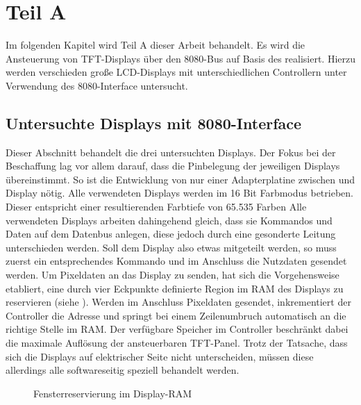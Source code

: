 	\chapter{Teil A}
\label{cha:TeilA}
Im folgenden Kapitel wird Teil A dieser Arbeit behandelt. Es wird die Ansteuerung von TFT-Displays über den 8080-Bus auf Basis des  realisiert. Hierzu werden verschieden große LCD-Displays mit unterschiedlichen Controllern unter Verwendung des 8080-Interface untersucht. 

\section{Untersuchte Displays mit 8080-Interface}
Dieser Abschnitt behandelt die drei untersuchten Displays. Der Fokus bei der Beschaffung lag vor allem darauf, dass die Pinbelegung der jeweiligen Displays übereinstimmt. So ist die Entwicklung von nur einer Adapterplatine zwischen  und Display nötig. Alle verwendeten Displays werden im 16 Bit Farbmodus betrieben. Dieser entspricht einer resultierenden Farbtiefe von 65.535 Farben\newline %
Alle verwendeten Displays arbeiten dahingehend gleich, dass sie Kommandos und Daten auf dem Datenbus anlegen, diese jedoch durch eine gesonderte Leitung unterschieden werden. Soll dem Display also etwas mitgeteilt werden, so muss zuerst ein entsprechendes Kommando und im Anschluss die Nutzdaten gesendet werden. Um Pixeldaten an das Display zu senden, hat sich die Vorgehensweise etabliert, eine durch vier Eckpunkte definierte Region im RAM des Displays zu reservieren (siehe ). Werden im Anschluss Pixeldaten gesendet, inkrementiert der Controller die Adresse und springt bei einem Zeilenumbruch automatisch an die richtige Stelle im RAM. Der verfügbare Speicher im Controller beschränkt dabei die maximale Auflösung der ansteuerbaren TFT-Panel. Trotz der Tatsache, dass sich die Displays auf elektrischer Seite nicht unterscheiden, müssen diese allerdings alle softwareseitig speziell behandelt werden.
\begin{figure}[h]
	\centering
{}
	\caption{Fensterreservierung im Display-RAM}
	\label{fig:ram_window}
\end{figure}
